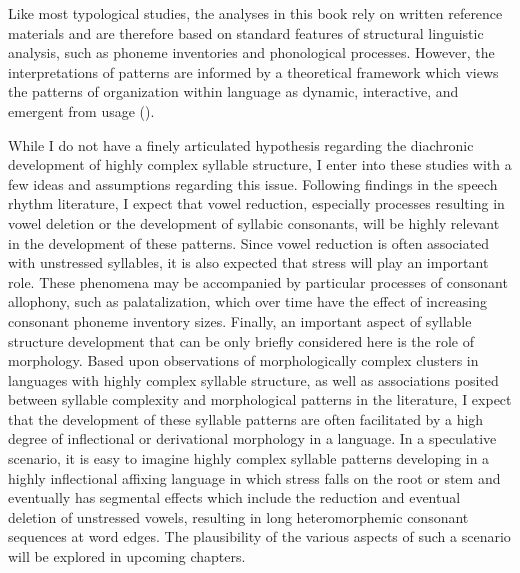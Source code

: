   Like most typological studies, the analyses in this book rely on written reference materials and are therefore based on standard features of structural linguistic analysis, such as phoneme inventories and phonological processes. However, the interpretations of patterns are informed by a theoretical framework which views the patterns of organization within language as dynamic, interactive, and emergent from usage (\citealt{BecknerEtAl2009,Bybee2001,Bybee2010}).

  While I do not have a finely articulated hypothesis regarding the diachronic development of highly complex syllable structure, I enter into these studies with a few ideas and assumptions regarding this issue. Following findings in the speech rhythm literature, I expect that vowel reduction, especially processes resulting in vowel deletion or the development of syllabic consonants, will be highly relevant in the development of these patterns. Since vowel reduction is often associated with unstressed syllables, it is also expected that stress will play an important role. These phenomena may be accompanied by particular processes of consonant allophony, such as palatalization, which over time have the effect of increasing consonant phoneme inventory sizes. Finally, an important aspect of syllable structure development that can be only briefly considered here is the role of morphology. Based upon observations of morphologically complex clusters in languages with highly complex syllable structure, as well as associations posited between syllable complexity and morphological patterns in the literature, I expect that the development of these syllable patterns are often facilitated by a high degree of inflectional or derivational morphology in a language. In a speculative scenario, it is easy to imagine highly complex syllable patterns developing in a highly inflectional affixing language in which stress falls on the root or stem and eventually has segmental effects which include the reduction and eventual deletion of unstressed vowels, resulting in long heteromorphemic consonant sequences at word edges. The plausibility of the various aspects of such a scenario will be explored in upcoming chapters.

